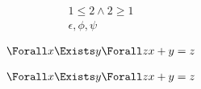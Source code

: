 \documentclass{article}
\begin{document}
    \begin{gather}
        1 \leq 2 \land
        2 \geq 1
        \\
        \epsilon
        , \phi
        , \psi
    \end{gather}

    \begin{gather}
        \Forall x \Exists y \Forall z {x + y = z}
    \end{gather}

    \begin{gather}
        \Forall x {\Exists y {\Forall z {x + y = z}}}
    \end{gather}
\end{document}
